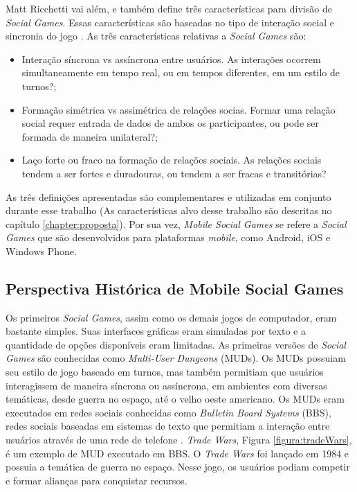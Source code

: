 Matt Ricchetti vai além, e também define três características para divisão de \textit{Social Games}. Essas características são baseadas no tipo de interação social e sincronia do jogo \cite{ricchetti2015}. As três características relativas a \textit{Social Games} são:

\begin{itemize}
  \item Interação síncrona vs assíncrona entre usuários. As interações ocorrem simultaneamente em tempo real, ou em tempos diferentes, em um estilo de turnos?;
  \item Formação simétrica vs assimétrica de relações socias. Formar uma relação social requer entrada de dados de ambos os participantes, ou pode ser formada de maneira unilateral?;
  \item Laço forte ou fraco na formação de relações sociais. As relações sociais tendem a ser fortes e duradouras, ou tendem a ser fracas e transitórias?
\end{itemize}

As três definições apresentadas são complementares e utilizadas em conjunto
durante esse trabalho (As características alvo desse trabalho são descritas no
capítulo \ref{chapter:proposta}).
Por sua vez, \textit{Mobile Social Games} se refere a \textit{Social Games} que são desenvolvidos para plataformas \textit{mobile}, como Android, iOS e Windows Phone.

  \subsection{Perspectiva Histórica de Mobile Social Games}

Os primeiros \textit{Social Games}, assim como os demais jogos de computador, eram bastante simples. Suas interfaces gráficas eram simuladas por texto e a quantidade de opções disponíveis eram limitadas. As primeiras versões de \textit{Social Games} são conhecidas como \textit{Multi-User Dungeons} (MUDs)\cite{edward1997}. Os MUDs possuiam seu estilo de jogo baseado em turnos, mas também permitiam que usuários interagissem de maneira síncrona ou assíncrona, em ambientes com diversas temáticas, desde guerra no espaço, até o velho oeste americano. Os MUDs eram executados em redes sociais conhecidas como \textit{Bulletin Board Systems} (BBS), redes sociais baseadas em sistemas de texto que permitiam a interação entre usuários através de uma rede de telefone \cite{fields2014}. \textit{Trade Wars}, Figura \ref{figura:tradeWars}, é um exemplo de MUD executado em BBS. O \textit{Trade Wars} foi lançado em 1984 e possuia a temática de guerra no espaço. Nesse jogo, os usuários podiam competir e formar alianças para conquistar recursos.


